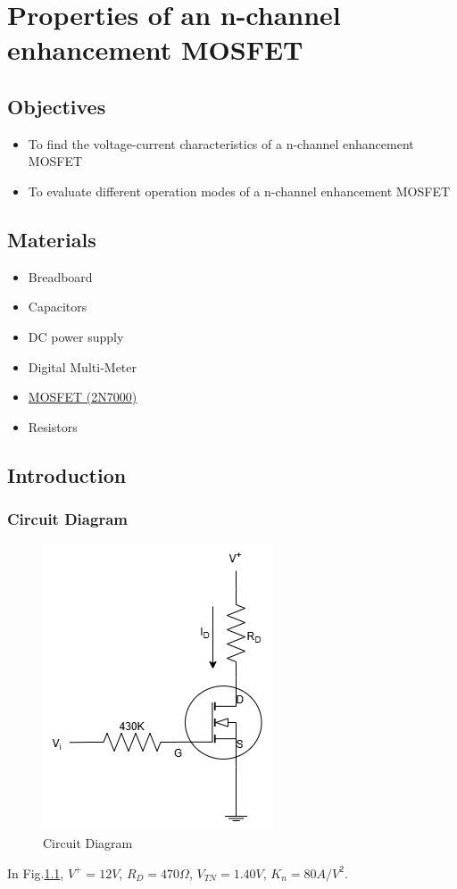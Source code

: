 \chapter{Properties of an n-channel enhancement MOSFET}


\section{Objectives}
\begin{itemize}
    \item To find the voltage-current characteristics of a n-channel enhancement MOSFET
    \item To evaluate different operation modes of a n-channel enhancement MOSFET
\end{itemize}

\section{Materials}
\begin{itemize}
    \item Breadboard
    \item Capacitors
    \item DC power supply
    \item Digital Multi-Meter
    \item \hyperref[2N7000_1]{MOSFET (2N7000)}
    \item Resistors
\end{itemize}

\section{Introduction}
    \subsection{Circuit Diagram}
    \begin{figure}[h]
        \centering
        \includegraphics[width=0.65\linewidth]{Lab08/Lab8.drawio.png}
        \caption{Circuit Diagram}
        \label{l8f}
    \end{figure}
    \FloatBarrier
In Fig.\ref{l8f}, $V^+=12V$, $R_D=470\Omega$, $V_{TN}=1.40V$, $K_n=80A/V^2$.
